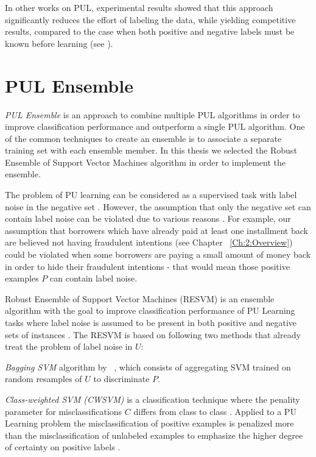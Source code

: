 In other works on PUL, experimental results showed that this approach significantly reduces the effort of labeling the data, while yielding competitive results, compared to the case when both positive and negative labels must be known before learning (see \cite{Li:2011}).

\section{PUL Ensemble}\label{Chapter:Ensemble}
\textit{PUL Ensemble} is an approach to combine multiple PUL algorithms in order to improve classification performance and outperform a single PUL algorithm. One of the common techniques to create an ensemble is to associate a separate training set with each ensemble member. In this thesis we selected the Robust Ensemble of Support Vector Machines algorithm \cite{Claesen:2014} in order to implement the ensemble.

The problem of PU learning can be considered as a supervised task with label noise in the negative set \cite{Claesen:2014}. However, the assumption that only the negative set can contain label noise can be violated due to various reasons \cite{journals/tnn/FrenayV14}. For example, our assumption that borrowers which have already paid at least one installment back are believed not having fraudulent intentions (see Chapter ~\ref{Ch:2:Overview}) could be violated when some borrowers are paying a small amount of money back in order to hide their fraudulent intentions - that would mean those positive examples \(P\) can contain label noise.

Robust Ensemble of Support Vector Machines (RESVM) is an ensemble algorithm with the goal to improve classification performance of PU Learning tasks where label noise is assumed to be present in both positive and negative sets of instances \cite{Claesen:2014}. The RESVM is based on following two methods that already treat the problem of label noise in \(U\):

\textit{Bagging SVM} algorithm by ~\cite{journals/prl/MordeletV14}, which consists of aggregating SVM trained on random resamples of \(U\) to discriminate \(P\). 

\textit{Class-weighted SVM (CWSVM)} is a classification technique where the penality parameter for misclassifications \(C\) differs from class to class \cite{conf/icdm/LiuDLLY03}. Applied to a PU Learning problem the misclassification of positive examples is penalized more than the misclassification of unlabeled examples to emphasize the higher degree of certainty on positive labels \cite{Claesen:2014}.

